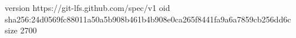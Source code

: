 version https://git-lfs.github.com/spec/v1
oid sha256:24d0569fc88011a50a5b908b461b4b908e0ca265f8441fa9a6a7859cb256dd6c
size 2700
